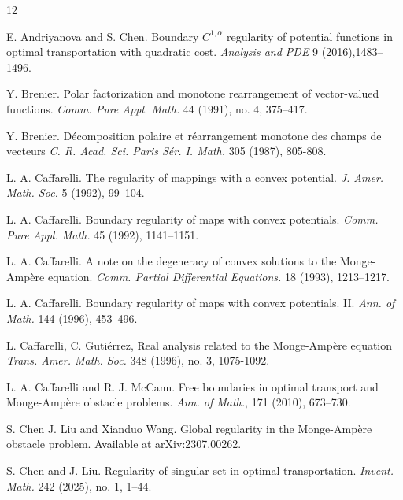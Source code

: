 \documentclass[11pt]{amsart}
\theoremstyle{plain}
\newcommand{\0}{\textbf{0}}
\numberwithin{equation}{section}
\numberwithin{equation}{section}
\numberwithin{figure}{section}
\begin{document}

\begin{thebibliography}{12}
	
	
	E. Andriyanova and S. Chen.
	Boundary $C^{1,\alpha}$ regularity of potential functions in optimal transportation with quadratic cost. \emph{Analysis and PDE} 9 (2016),1483--1496.
	
	Y. Brenier.
	Polar factorization and monotone rearrangement of vector-valued functions. 
	\emph{Comm. Pure Appl. Math.} 44 (1991), no. 4, 375--417.
	
	 Y. Brenier. D\'ecomposition polaire et r\'earrangement monotone des champs de vecteurs \emph{C. R. Acad. Sci. Paris S\'er. I. Math.} 305 (1987), 805-808. 
	
	L. A. Caffarelli. The regularity of mappings with a convex potential. \emph{J. Amer. Math. Soc.} 5 (1992), 99--104.
	
	L. A. Caffarelli. Boundary regularity of maps with convex potentials. \emph{Comm. Pure Appl. Math.} 45 (1992), 1141--1151.
	
	L. A. Caffarelli.  A note on the degeneracy of convex solutions to the Monge-Amp\`ere equation.
	\emph{Comm. Partial Differential Equations.} 18 (1993), 1213--1217.
	
	L. A. Caffarelli. Boundary regularity of maps with convex potentials. II.
	\emph{Ann. of Math.} 144 (1996), 453--496.
	
	 L. Caffarelli, C. Guti\'errez, Real analysis related to the Monge-Amp\`ere equation \emph{Trans. Amer. Math. Soc.} 348 (1996), no. 3, 1075-1092.
	
	  L. A. Caffarelli and R. J. McCann. 
	Free boundaries in optimal transport and Monge-Amp\`{e}re obstacle problems.
	\textit{Ann. of Math.}, 171 (2010), 673--730.
	
	
	S. Chen J. Liu and Xianduo Wang. Global regularity in the Monge-Amp\`ere obstacle problem. Available at arXiv:2307.00262.
	
	S. Chen and J. Liu. Regularity of singular set in optimal transportation. 
	\emph{Invent. Math.} 242 (2025), no. 1, 1–44.
	

\end{thebibliography}
\end{document}
